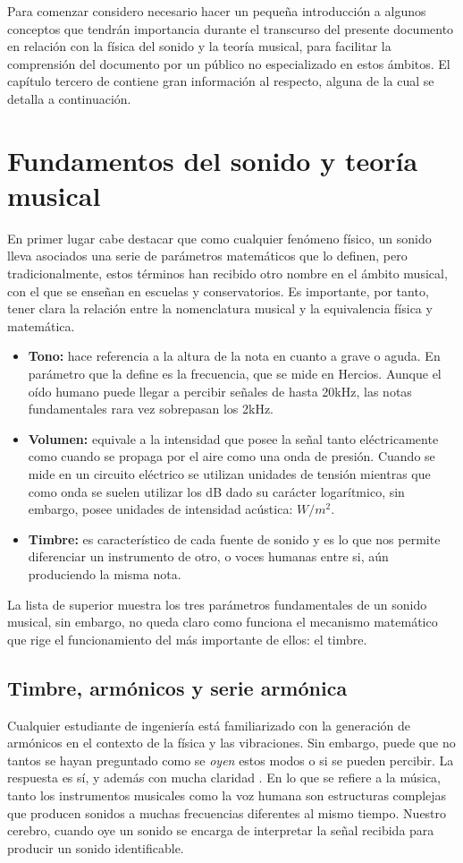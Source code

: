 Para comenzar considero necesario hacer un pequeña introducción a algunos conceptos que tendrán importancia durante el transcurso del presente documento en relación con la física del sonido y la teoría musical, para facilitar la comprensión del documento por un público no especializado en estos ámbitos. El capítulo tercero de \cite{Instinto} contiene gran información al respecto, alguna de la cual se detalla a continuación. 

\section{Fundamentos del sonido y teoría musical}
En primer lugar cabe destacar que como cualquier fenómeno físico, un sonido lleva asociados una serie de parámetros matemáticos que lo definen, pero tradicionalmente, estos términos han recibido otro nombre en el ámbito musical, con el que se enseñan en escuelas y conservatorios. Es importante, por tanto, tener clara la relación entre la nomenclatura musical y la equivalencia física y matemática.
\begin{itemize}
\item \textbf{Tono:} hace referencia a la altura de la nota en cuanto a grave o aguda. En parámetro que la define es la frecuencia, que se mide en Hercios. Aunque el oído humano puede llegar a percibir señales de hasta 20kHz, las notas fundamentales rara vez sobrepasan los 2kHz.
\item \textbf{Volumen:} equivale a la intensidad que posee la señal tanto eléctricamente como cuando se propaga por el aire como una onda de presión. Cuando se mide en un circuito eléctrico se utilizan unidades de tensión mientras que como onda se suelen utilizar los dB dado su carácter logarítmico, sin embargo, posee unidades de intensidad acústica: $W/m^{2}$.
\item\textbf{Timbre:} es característico de cada fuente de sonido y es lo que nos permite diferenciar un instrumento de otro, o voces humanas entre si, aún produciendo la misma nota.
\end{itemize}

La lista de superior muestra los tres parámetros fundamentales de un sonido musical, sin embargo, no queda claro como funciona el mecanismo matemático que rige el funcionamiento del más importante de ellos: el timbre.

\subsection{Timbre, armónicos y serie armónica}
Cualquier estudiante de ingeniería está familiarizado con la generación de armónicos en el contexto de la física y las vibraciones. Sin embargo, puede que no tantos se hayan preguntado como se \emph{oyen} estos modos o si se pueden percibir. La respuesta es sí, y además con mucha claridad \cite{arm_wood}. En lo que se refiere a la música, tanto los instrumentos musicales como la voz humana son estructuras complejas que producen sonidos a muchas frecuencias diferentes al mismo tiempo. Nuestro cerebro, cuando oye un sonido se encarga de interpretar la señal recibida para producir un sonido identificable. 

